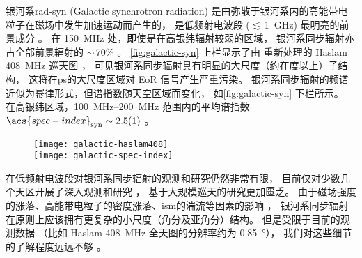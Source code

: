 银河系\acs{rad-syn} (Galactic synchrotron radiation)
是由弥散于银河系内的高能带电粒子在磁场中发生加速运动而产生的，
是低频射电波段 ($\lesssim$\,\SI{1}{\GHz}) 最明亮的前景成分
\cite{bernardi2009,ghosh2012}。
在 \SI{150}{\MHz} 处，即使是在高银纬辐射较弱的区域，
银河系同步辐射亦占全部前景辐射的 $\sim$\,70\% \cite{shaver1999}。
\autoref{fig:galactic-syn} 上栏显示了由 
重新处理的 Haslam \SI{408}{\MHz} 巡天图 \cite{haslam1982}，
可见银河系同步辐射具有明显的大尺度（约在度以上）子结构，
这将在\ac{ps}的大尺度区域对 EoR 信号产生严重污染。
银河系同步辐射的频谱近似为幂律形式，但谱指数随天空区域而变化，
如\autoref{fig:galactic-syn} 下栏所示。
在高银纬区域，\SIrange{100}{200}{\MHz} 范围内的平均谱指数
$\acs{spec-index}_{\R{syn}} \sim \num{2.5 +- 0.1}$ \cite{rogers2008}。

\begin{figure}[htp]
  \centering
  \texttt{[image: galactic-haslam408]}
  \\\medskip
  \texttt{[image: galactic-spec-index]}
  \label{fig:galactic-syn}
\end{figure}

在低频射电波段对银河系同步辐射的观测和研究仍然非常有限，
目前仅对少数几个天区开展了深入观测和研究
\cite{bernardi2009,ghosh2012,iacobelli2013,choudhuri2017}，
基于大规模巡天的研究更加匮乏。
由于磁场强度的涨落、高能带电粒子的密度涨落、\ac{ism}的湍流等因素的影响
\cite{waelkens2009,lazarian2012syn,iacobelli2013}，
银河系同步辐射在原则上应该拥有更复杂的小尺度（角分及亚角分）结构。
但是受限于目前的观测数据
（比如 Haslam \SI{408}{\MHz} 全天图的分辨率约为 \SI{0.85}{\degree}），
我们对这些细节的了解程度远远不够 \cite{ali2016}。

